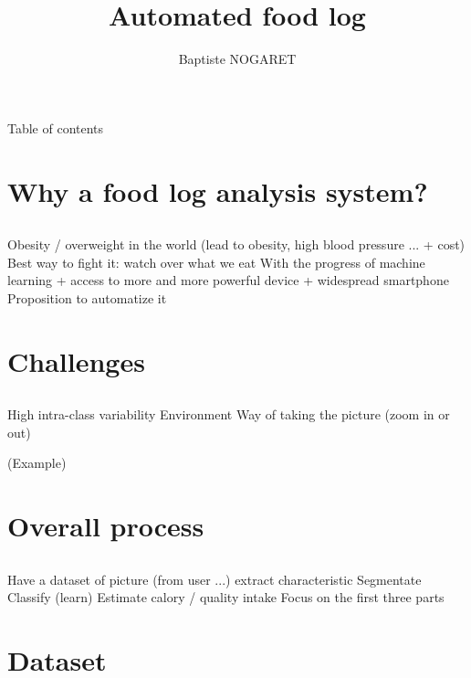 \documentclass[aspectratio=169]{beamer}
\author{Baptiste NOGARET}
\title{Automated food log}
\let\oldsection\section
\renewcommand{\section}[1]{
    \oldsection{#1}	
    \subsection{}
}
\newenvironment{myframe}[1][t]{\begin{frame}[#1]{\secname}{\subsecname}}{\end{frame}}
\begin{document}
	
	\begin{frame}[plain]
		\titlepage
	\end{frame}
    
    \begin{frame}{Table of contents}
        \begin{multicols}{2}
            \tableofcontents
        \end{multicols}
    \end{frame}
    
    \section{Why a food log analysis system?}
    
	\begin{myframe}
        Obesity / overweight in the world (lead to obesity, high blood pressure ... + cost)
        Best way to fight it: watch over what we eat
        With the progress of machine learning + access to more and more powerful device + widespread smartphone
        Proposition to automatize it
	\end{myframe}
    
    \section{Challenges}
    
    \begin{myframe}
        High intra-class variability
        Environment
        Way of taking the picture (zoom in or out)
        
        (Example)
    \end{myframe}
    
    \section{Overall process}
    
    \begin{myframe}
        Have a dataset of picture (from user ...)
        extract characteristic
        Segmentate
        Classify (learn)
        Estimate calory / quality intake
        Focus on the first three parts
    \end{myframe}
    
    \section{Dataset}
    
\end{document}
